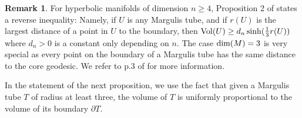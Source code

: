 \documentclass[11pt]{amsart}
\theoremstyle{plain}
\theoremstyle{plain}
\theoremstyle{definition}
\newtheorem{remark}[theorem]{Remark}
\begin{document}
\begin{remark} 
For hyperbolic manifolds of dimension $n\geq 4$, 
Proposition 2 of \cite{BS87} states a reverse inequality:
Namely, if $U$ is any Margulis tube, and if $r(U)$ is
the largest distance of a point in $U$ to the boundary,
then ${\rm Vol}(U)\geq d_n\sinh(\frac{1}{3}r(U))$
where $d_n>0$ is a constant only depending on $n$.
The case ${\rm dim}(M)=3$ is very special as every point
on the boundary of a Margulis tube has the same distance
to the core geodesic. We refer to p.3 of \cite{BCD93} for more
information.
\end{remark} 

In the statement of the next proposition, we use the fact that 
given a Margulis tube $T$ of radius at least three, the volume of 
$T$ is uniformly proportional to the volume of its boundary 
$\partial T$. 
\end{document}
